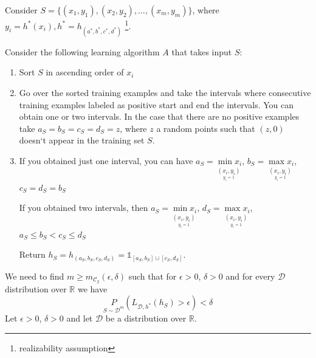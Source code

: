 \documentclass{article}
\newcommand{\<}{\langle}
\renewcommand{\>}{\rangle}
\theoremstyle{definition}
\def\gC{{\mathcal{C}}}
\def\gD{{\mathcal{D}}}
\def\sR{{\mathbb{R}}}
\def\sone{{\mathds{1}}}
\newcommand{\uset}{\underset}
\def\sone{{\mathds{1}}}
\newcommand{\uset}{\underset}
\begin{document}
Consider $S = \{(x_1, y_1), (x_2, y_2), \dots, (x_m, y_m)\}$, where ${y_i = h^*(x_i), h^* = h_{(a^*, b^*, c^*, d^*)}}$ \footnote{realizability assumption}.

\begin{figure}[h]
\centering
{}
\end{figure}

Consider the following learning algorithm $A$ that takes input $S$:
\begin{enumerate}[label=\roman*)]
  \item Sort $S$ in ascending order of $x_i$
  \item Go over the sorted training examples and take the intervals where consecutive training
        examples labeled as positive start and end the intervals.
        You can obtain one or two intervals. In the case that there are no positive examples take $a_S = b_S = c_S = d_S = z$, where $z$ a random points such that $(z,0)$ doesn`t appear in the training set $S$.
  \item If you obtained just one interval, you can have
    $a_S = \uset{\uset{y_i = 1}{(x_i, y_i)}}{\min x_i}$,  %
    $b_S = \uset{\uset{y_i = 1}{(x_i, y_i)}}{\max x_i}$,
    $c_S = d_S = b_S$
    
    If you obtained two intervals, then
    $a_S = \uset{\uset{y_i = 1}{(x_i, y_i)}}{\min x_i}$,
    $d_S = \uset{\uset{y_i = 1}{(x_i, y_i)}}{\max x_i}$,
    $a_S \leq b_S < c_S \leq d_S$
    
    Return $h_S = h_{(a_S, b_S, c_S, d_S)} = \sone_{[a_S, b_S] \cup [c_S, d_S]}$.
\end{enumerate}
We need to find $m \geq m_{\gC_2}(\epsilon, \delta)$ such that for $\epsilon > 0$, $\delta > 0$
and for every $\gD$ distribution over $\sR$ we have
\begin{equation*}
  \uset{S \sim \gD^m}{P}(L_{\gD, h^*}(h_S) > \epsilon) < \delta
\end{equation*}
Let $\epsilon > 0$, $\delta > 0$ and let $\gD$ be a distribution over $\sR$.
 
\end{document}
